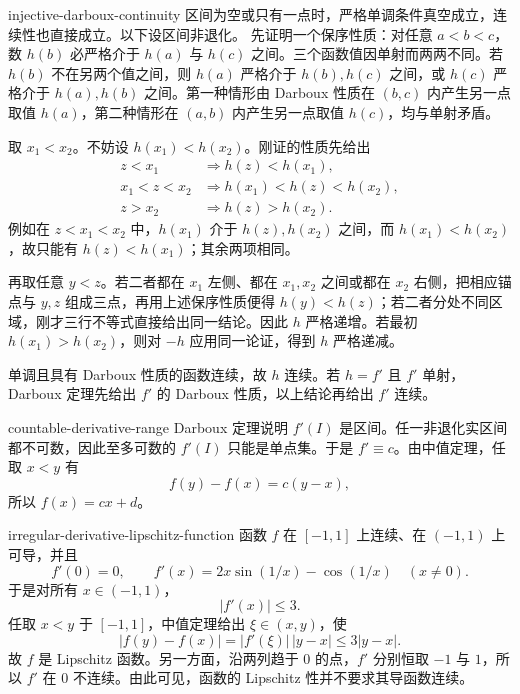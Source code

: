 \begin{solution}{injective-darboux-continuity}
区间为空或只有一点时，严格单调条件真空成立，连续性也直接成立。以下设区间非退化。
先证明一个保序性质：对任意 \(a<b<c\)，数 \(h(b)\) 必严格介于 \(h(a)\) 与 \(h(c)\) 之间。三个函数值因单射而两两不同。若 \(h(b)\) 不在另两个值之间，则 \(h(a)\) 严格介于 \(h(b),h(c)\) 之间，或 \(h(c)\) 严格介于 \(h(a),h(b)\) 之间。第一种情形由 Darboux 性质在 \((b,c)\) 内产生另一点取值 \(h(a)\)，第二种情形在 \((a,b)\) 内产生另一点取值 \(h(c)\)，均与单射矛盾。

取 \(x_1<x_2\)。不妨设 \(h(x_1)<h(x_2)\)。刚证的性质先给出
\[
 \begin{array}{ll}
  z<x_1 &\Longrightarrow h(z)<h(x_1),\\
  x_1<z<x_2 &\Longrightarrow h(x_1)<h(z)<h(x_2),\\
  z>x_2 &\Longrightarrow h(z)>h(x_2).
 \end{array}
\]
例如在 \(z<x_1<x_2\) 中，\(h(x_1)\) 介于 \(h(z),h(x_2)\) 之间，而 \(h(x_1)<h(x_2)\)，故只能有 \(h(z)<h(x_1)\)；其余两项相同。

再取任意 \(y<z\)。若二者都在 \(x_1\) 左侧、都在 \(x_1,x_2\) 之间或都在 \(x_2\) 右侧，把相应锚点与 \(y,z\) 组成三点，再用上述保序性质便得 \(h(y)<h(z)\)；若二者分处不同区域，刚才三行不等式直接给出同一结论。因此 \(h\) 严格递增。若最初 \(h(x_1)>h(x_2)\)，则对 \(-h\) 应用同一论证，得到 \(h\) 严格递减。

单调且具有 Darboux 性质的函数连续，故 \(h\) 连续。若 \(h=f'\) 且 \(f'\) 单射，Darboux 定理先给出 \(f'\) 的 Darboux 性质，以上结论再给出 \(f'\) 连续。
\end{solution}

\begin{solution}{countable-derivative-range}
Darboux 定理说明 \(f'(I)\) 是区间。任一非退化实区间都不可数，因此至多可数的 \(f'(I)\) 只能是单点集。于是 \(f'\equiv c\)。由中值定理，任取 \(x<y\) 有
\[
 f(y)-f(x)=c(y-x),
\]
所以 \(f(x)=cx+d\)。
\end{solution}

\begin{solution}{irregular-derivative-lipschitz-function}
函数 \(f\) 在 \([-1,1]\) 上连续、在 \((-1,1)\) 上可导，并且
\[
 f'(0)=0,
 \qquad
 f'(x)=2x\sin(1/x)-\cos(1/x)\quad(x\ne0).
\]
于是对所有 \(x\in(-1,1)\)，
\[
 |f'(x)|\le3.
\]
任取 \(x<y\) 于 \([-1,1]\)，中值定理给出 \(\xi\in(x,y)\)，使
\[
 |f(y)-f(x)|=|f'(\xi)|\,|y-x|\le3|y-x|.
\]
故 \(f\) 是 Lipschitz 函数。另一方面，沿两列趋于 \(0\) 的点，\(f'\) 分别恒取 \(-1\) 与 \(1\)，所以 \(f'\) 在 \(0\) 不连续。由此可见，函数的 Lipschitz 性并不要求其导函数连续。
\end{solution}

